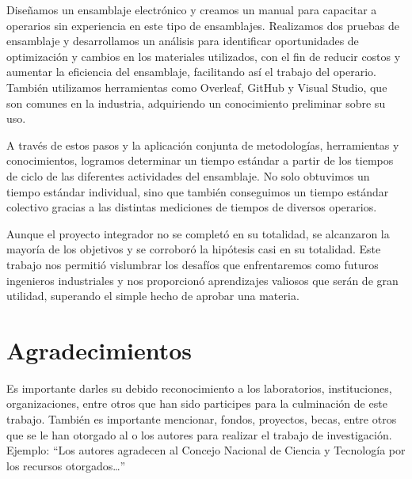     Diseñamos un ensamblaje electrónico y creamos un manual para capacitar a operarios sin experiencia en este tipo de ensamblajes. Realizamos dos pruebas de ensamblaje y desarrollamos un análisis para identificar oportunidades de optimización y cambios en los materiales utilizados, con el fin de reducir costos y aumentar la eficiencia del ensamblaje, facilitando así el trabajo del operario. También utilizamos herramientas como Overleaf, GitHub y Visual Studio, que son comunes en la industria, adquiriendo un conocimiento preliminar sobre su uso.
    
    A través de estos pasos y la aplicación conjunta de metodologías, herramientas y conocimientos, logramos determinar un tiempo estándar a partir de los tiempos de ciclo de las diferentes actividades del ensamblaje. No solo obtuvimos un tiempo estándar individual, sino que también conseguimos un tiempo estándar colectivo gracias a las distintas mediciones de tiempos de diversos operarios.
    
    Aunque el proyecto integrador no se completó en su totalidad, se alcanzaron la mayoría de los objetivos y se corroboró la hipótesis casi en su totalidad. Este trabajo nos permitió vislumbrar los desafíos que enfrentaremos como futuros ingenieros industriales y nos proporcionó aprendizajes valiosos que serán de gran utilidad, superando el simple hecho de aprobar una materia.
    
    \section{Agradecimientos}
    
    Es importante darles su debido reconocimiento a los laboratorios, instituciones, organizaciones, entre otros que han sido participes para la culminación de este trabajo. También es importante mencionar, fondos, proyectos, becas, entre otros que se le han otorgado al o los autores para realizar el trabajo de investigación. Ejemplo: “Los autores agradecen al Concejo Nacional de Ciencia y Tecnología por los recursos otorgados…”
    
    
